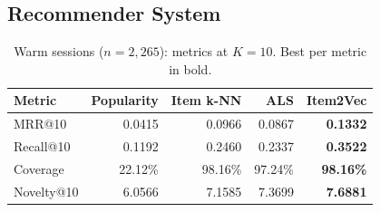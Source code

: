 \documentclass[a4paper,oneside,12pt]{book}
\begin{document}





\subsection{Recommender System}

\begin{table}[H]
\centering
\caption{Warm sessions ($n = 2{,}265$): metrics at $K = 10$.
         Best per metric in bold.}
\label{tab:warm_results}
\begin{tabular}{lrrrr}
\hline
Metric      & Popularity & Item k-NN & ALS    & Item2Vec \\
\hline
MRR@10      & 0.0415     & 0.0966    & 0.0867 & \textbf{0.1332} \\
Recall@10   & 0.1192     & 0.2460    & 0.2337 & \textbf{0.3522} \\
Coverage    & 22.12\%    & 98.16\%   & 97.24\% & \textbf{98.16\%} \\
Novelty@10  & 6.0566     & 7.1585    & 7.3699 & \textbf{7.6881} \\
\hline
\end{tabular}
\label{warm}
\end{table}
\end{document}
